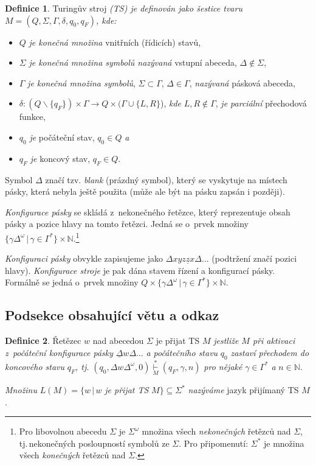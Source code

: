 \documentclass[11pt,twocolumn,a4paper]{article}
\theoremstyle{definition}
\newtheorem{definition}{Definice}
\theoremstyle{plain}
\begin{document}
\noindent
\begin{definition}\label{def:turinguv}
Turingův stroj \emph{(TS) je definován jako šestice tvaru $M = (Q, \Sigma, \Gamma, \delta, q_0, q_F )$, kde:}

\begin{itemize}
\item $Q$ \emph{je konečná množina} vnitřních (řídicích) stavů,
\item $\Sigma$ \emph{je konečná množina symbolů nazývaná} vstupní
abeceda, $\Delta \notin \Sigma$,
\item $\Gamma$ \emph{je konečná množina symbolů}, $\Sigma \subset \Gamma$, $\Delta \in \Gamma$,
\emph{nazývaná} pásková abeceda,
\item $\delta : (Q\backslash \{q_F \})\times \Gamma \rightarrow Q \times (\Gamma \cup \{L, R\}$), \emph{kde} $L, R \notin \Gamma$, \emph{je parciální} přechodová funkce,
\item $q_0$ \emph{je} počáteční stav, $q_0 \in Q$ \emph a
\item $q_F$ \emph{je} koncový stav, $q_F \in Q$.
\end{itemize}

\end{definition}
Symbol $\Delta$ značí tzv. \emph{blank} (prázdný symbol), který se vyskytuje na místech pásky, která nebyla ještě použita (může ale být na pásku zapsán i později). \par

\emph{Konfigurace pásky} se skládá z~nekonečného řetězce, který reprezentuje obsah pásky a pozice hlavy na tomto řetězci. Jedná se o~prvek množiny  $\{\gamma \Delta^\omega\,|\,\gamma \in \Gamma^*\}\times \mathbb{N}$.\footnote{Pro libovolnou abecedu $\Sigma$ je $\Sigma^\omega$ množina všech  \emph{nekonečných} řetězců nad $\Sigma$, tj.\,nekonečných posloupností symbolů ze $\Sigma$. Pro připomenutí: $\Sigma^*$ je množina všech \emph{konečných} řetězců nad $\Sigma$.}

\noindent \emph{Konfiguraci pásky} obvykle zapisujeme jako $\Delta xyz\underline{z}x \Delta$... (podtržení značí pozici hlavy). \emph{Konfigurace stroje} je pak dána stavem řízení a konfigurací pásky. Formálně se jedná o~prvek množiny $Q \times \{\gamma \Delta^\omega\,|\,\gamma \in \Gamma^*\}\times \mathbb{N}$.


\subsection{Podsekce obsahující větu a odkaz}
\begin{definition}\label{def:retezec}
Řetězec $w$ nad abecedou $\Sigma$ je přijat TS $M$ \emph{jestliže $M$ při aktivaci z~počáteční konfigurace pásky} $\underline{\Delta}w\Delta$... \emph{a počátečního stavu} $q_0$ \emph{zastaví přechodem do koncového stavu} $q_F$\emph{, tj.} $(q_0, \Delta w\Delta^\omega, 0) \overset{*}{\underset{M}{\vdash}} (q_F , \gamma, n)$ \emph{pro nějaké} $\gamma\in\Gamma^*$ \emph{a} $n \in \mathbb{N}$.

\emph{Množinu} $L(M) = \{w\,|\,w$ \emph{je přijat TS} $M \} \subseteq\Sigma^*$ \emph{nazýváme} jazyk přijímaný TS $M$.

\end{definition}
\end{document}
